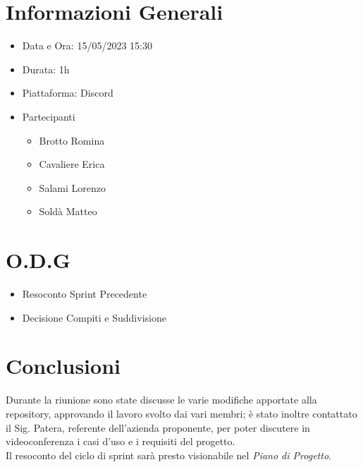 \documentclass[a4paper, 12pt]{article}
\begin{document}
\makefrontpage

\section*{Informazioni Generali}
\begin{itemize}
    \item Data e Ora: 15/05/2023 15:30
    \item Durata: 1h
    \item Piattaforma: Discord
    \item Partecipanti
    \begin{itemize}
        \item Brotto Romina
        \item Cavaliere Erica
        \item Salami Lorenzo
        \item Soldà Matteo
    \end{itemize}
\end{itemize}

\section*{O.D.G}
\begin{itemize}
    \item Resoconto Sprint Precedente
    \item Decisione Compiti e Suddivisione
\end{itemize}

\section*{Conclusioni}
Durante la riunione sono state discusse le varie modifiche apportate alla repository, approvando il lavoro svolto dai vari membri; è stato inoltre contattato il Sig. Patera, referente dell'azienda proponente, per poter discutere in videoconferenza i casi d'uso e i requisiti del progetto.\\
Il resoconto del ciclo di sprint sarà presto visionabile nel \textit{Piano di Progetto}.\\
\end{document}
